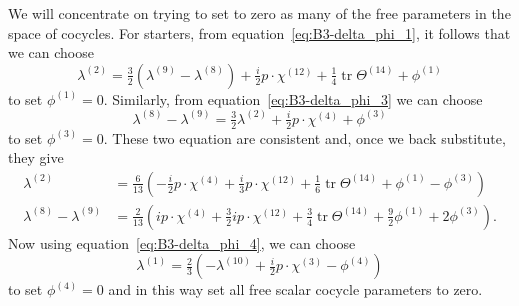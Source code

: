 \documentclass[11pt,reqno,a4paper,final]{amsart}
\theoremstyle{plain}
\theoremstyle{definition}
\newcommand{\phisup}[1]{\phi^{(#1)}}
\newcommand{\tr}{\operatorname{tr}}
\newcommand{\1}{\mathbb{1}}
\numberwithin{equation}{section}
\begin{document}
\begin{appendices}
We will concentrate on trying to set to zero as many of the free
parameters in the space of cocycles.  For starters, from
equation~\eqref{eq:B3-delta_phi_1}, it follows that we can choose
\begin{equation}
 \lambda^{(2)}  = \tfrac32 (\lambda^{(9)}-\lambda^{(8)}) + \tfrac i2 p \cdot \chi^{(12)} + \tfrac14 \tr \Theta^{(14)} + \phisup{1}
\end{equation}
to set $\phi^{(1)} = 0$.  Similarly, from equation~\eqref{eq:B3-delta_phi_3}
we can choose
\begin{equation}
  \lambda^{(8)} - \lambda^{(9)}= \tfrac32 \lambda^{(2)} + \tfrac i2 p \cdot \chi^{(4)} + \phi^{(3)}
\end{equation}
to set $\phi^{(3)} = 0$.  These two equation are consistent and, once we back substitute, they give
\begin{equation}
  \begin{split}
    \lambda^{(2)} &= \tfrac 6{13} \left( -\tfrac i2 p \cdot \chi^{(4)} + \tfrac i3 p \cdot \chi^{(12)} + \tfrac16 \tr \Theta^{(14)} + \phisup{1} - \phisup{3}\right)\\
      \lambda^{(8)} - \lambda^{(9)} &= \tfrac 2{13} \left( i p \cdot \chi^{(4)} + \tfrac32 i p \cdot \chi^{(12)} + \tfrac 34 \tr \Theta^{(14)} + \tfrac 92 \phisup{1} + 2 \phisup{3}\right).
  \end{split}
\end{equation}
Now using equation~\eqref{eq:B3-delta_phi_4}, we can choose
\begin{equation}
  \lambda^{(1)} = \tfrac 23 \left( - \lambda^{(10)} + \tfrac i2 p \cdot \chi^{(3)} - \phisup{4}\right)
\end{equation}
to set $\phi^{(4)}=0$ and in this way set all free scalar cocycle parameters to zero.


\end{appendices}
\end{document}
